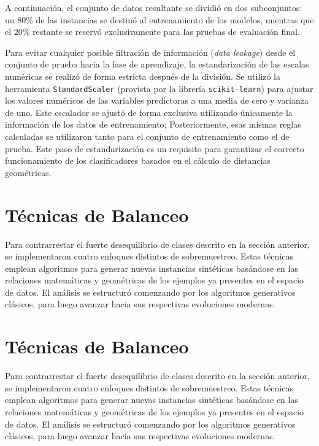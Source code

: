\documentclass[a4paper,11pt]{book}
\begin{document}
A continuación, el conjunto de datos resultante se dividió en dos subconjuntos: un 80\% de las instancias se destinó al entrenamiento de los modelos, mientras que el 20\% restante se reservó exclusivamente para las pruebas de evaluación final. 

Para evitar cualquier posible filtración de información (\textit{data leakage}) desde el conjunto de prueba hacia la fase de aprendizaje, la estandarización de las escalas numéricas se realizó de forma estricta después de la división. Se utilizó la herramienta \texttt{StandardScaler} (provista por la librería \texttt{scikit-learn}) para ajustar los valores numéricos de las variables predictoras a una media de cero y varianza de uno. Este escalador se ajustó de forma exclusiva utilizando únicamente la información de los datos de entrenamiento; Posteriormente, esas mismas reglas calculadas se utilizaron tanto para el conjunto de entrenamiento como el de prueba. Este paso de estandarización es un requisito para garantizar el correcto funcionamiento de los clasificadores basados en el cálculo de distancias geométricas.\section{Técnicas de Balanceo}
Para contrarrestar el fuerte desequilibrio de clases descrito en la sección anterior, se implementaron cuatro enfoques distintos de sobremuestreo. Estas técnicas emplean algoritmos para generar nuevas instancias sintéticas basándose en las relaciones matemáticas y geométricas de los ejemplos ya presentes en el espacio de datos. El análisis se estructuró comenzando por los algoritmos generativos clásicos, para luego avanzar hacia sus respectivas evoluciones modernas.

\section{Técnicas de Balanceo}
Para contrarrestar el fuerte desequilibrio de clases descrito en la sección anterior, se implementaron cuatro enfoques distintos de sobremuestreo. Estas técnicas emplean algoritmos para generar nuevas instancias sintéticas basándose en las relaciones matemáticas y geométricas de los ejemplos ya presentes en el espacio de datos. El análisis se estructuró comenzando por los algoritmos generativos clásicos, para luego avanzar hacia sus respectivas evoluciones modernas.
\end{document}
